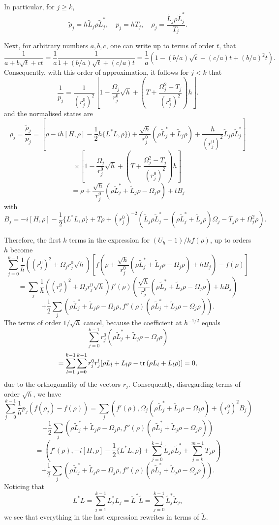 \documentclass[12pt]{article}
\def\tr{\rm{tr}}
\newcommand{\Om}{\Omega}
\begin{document}
In particular, for $j\ge k$,
\[
\tilde \rho_j =h\tilde L_j \rho \tilde L_j^*, \quad p_j=hT_j, \quad \rho_j=\frac{\tilde L_j \rho \tilde L_j^*}{T_j}.
\]

Next, for arbitrary numbers $a,b,c$, one can write up to terms of order $t$, that
\[
\frac{1}{a+b\sqrt t +ct}
=\frac{1}{a} \frac{1}{1+(b/a) \sqrt t+(c/a) t}
=\frac{1}{a}(1-(b/a) \sqrt t-(c/a) t+(b/a)^2 t).
\]
Consequently, with this order of approximation, it follows for $j<k$ that
\[
\frac{1}{p_j}=\frac{1}{(r_j^0)^2}
\left[1- \frac{\Om_j}{r^0_j} \sqrt h  +\left(T+\frac{\Om_j^2-T_j}{(r^0_j)^2}\right)h \right].
\]
and the normalised states are
\[
\rho_j=\frac{\tilde \rho_j}{p_j}=[\rho -ih[H, \rho] -\frac12 h\{L^*L,\rho\})
+\frac{\sqrt h}{r^0_j} (\rho \tilde L_j^*+\tilde L_j \rho)+\frac{h}{(r^0_j)^2}\tilde L_j \rho \tilde L_j^*]
\]
\[
\times \left[1- \frac{\Om_j}{r^0_j} \sqrt h  +\left(T+\frac{\Om_j^2-T_j}{(r^0_j)^2}\right)h \right]
\]
\[
=\rho +  \frac{\sqrt h}{r^0_j}  (\rho \tilde L_j^* + \tilde L_j\rho-\Om_j \rho)+tB_j
\]
with
\[
B_j=-i[H, \rho] -\frac12 \{L^*L,\rho\}+ T \rho
 +(r_j^0)^{-2} (\tilde L_j\rho \tilde L_j^*-(\rho \tilde L_j^* + \tilde L_j\rho) \Om_j -T_j\rho +\Om_j^2  \rho).
\]

Therefore, the first $k$ terms in the expression for $(U_h-1)/h f(\rho)$, up to orders $h$ become
\[
\sum_{j=0}^{k-1} \frac{1}{h} ((r_j^0)^2 +\Om_j r^0_j \sqrt h)
[f(\rho +  \frac{\sqrt h}{r^0_j}  (\rho \tilde L_j^* + \tilde L_j\rho-\Om_j \rho)+hB_j)-f(\rho)]
\]
\[
=\sum_j  \frac{1}{h} ((r_j^0)^2 +\Om_j r^0_j \sqrt h)
f'(\rho) \left(\frac{\sqrt h}{r^0_j}  (\rho \tilde L_j^* + \tilde L_j\rho-\Om_j \rho)+hB_j\right)
\]
\[
+\frac12 \sum_j  \left(\rho \tilde L_j^* + \tilde L_j\rho-\Om_j \rho,
f''(\rho)  (\rho \tilde L_j^* + \tilde L_j\rho-\Om_j \rho)\right).
\]
The terms of order $1/\sqrt h$ cancel, because the coefficient at $h^{-1/2}$ equals
\[
\sum_{j=0}^{k-1} r_j^0   (\rho \tilde L_j^* + \tilde L_j\rho-\Om_j \rho)
\]
\[
=\sum_{l=1}^{k-1} \sum_{j=0}^{k-1} r^0_j r^l_j [\rho L_l +L_l \rho -{\tr}\, (\rho L_l+L_l \rho)]=0,
\]
due to the orthogonality of the vectors $r_j$. Consequently, disregarding terms of order $\sqrt h$, we have
\[
\sum_{j=0}^{k-1} \frac{1}{h} p_j (f(\rho_j)-f(\rho))
=\sum_j \left(f'(\rho), \Om_j  (\rho \tilde L_j^* + \tilde L_j\rho-\Om_j \rho)+(r^0_j)^2B_j\right)
\]
\[
+\frac12 \sum_j  \left(\rho \tilde L_j^* + \tilde L_j\rho-\Om_j \rho,
f''(\rho)  (\rho \tilde L_j^* + \tilde L_j\rho-\Om_j \rho)\right)
\]
\[
=\left(f'(\rho), -i[H, \rho] -\frac12 \{L^*L,\rho\} +\sum_{j=0}^{k-1}\tilde L_j \rho \tilde L_j^*
+\sum_{j=k}^{m-1} T_j \rho \right)
\]
\[
+\frac12 \sum_j  \left(\rho \tilde L_j^* + \tilde L_j\rho-\Om_j \rho,
f''(\rho)  (\rho \tilde L_j^* + \tilde L_j\rho-\Om_j \rho)\right).
\]
Noticing that
\[
L^*L=\sum_{j=1}^{k-1} L_j^*L_j=\tilde L^* \tilde L=\sum_{j=0}^{k-1}\tilde L_j^* \tilde L_j,
\]
we see that everything in the last expression rewrites in terms of $\tilde L$.
\end{document}
